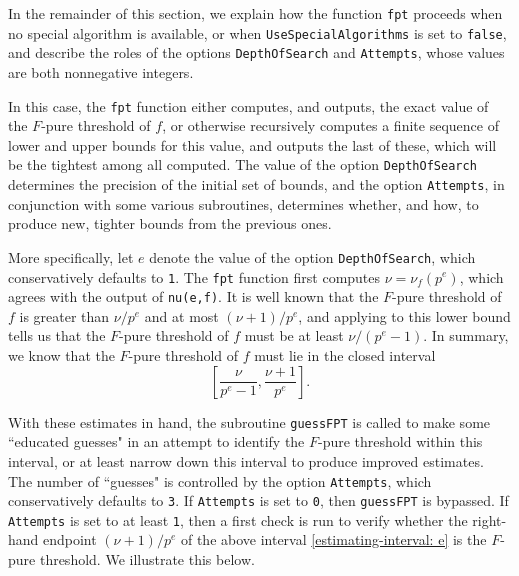 \documentclass{amsart}
\begin{document}
In the remainder of this section, we explain how the function  \texttt{fpt} proceeds when no special algorithm is available, or when \texttt{UseSpecialAlgorithms} is set to \texttt{false}, and describe the roles of the options \texttt{DepthOfSearch} and \texttt{Attempts}, whose values are both nonnegative integers.

In this case, the \texttt{fpt} function either computes, and outputs, the exact value of the $F$-pure threshold of $f$, or otherwise recursively computes a finite sequence of lower and upper bounds for this value, and outputs the last of these, which will be the tightest among all computed.  The value of the option \texttt{DepthOfSearch} determines the precision of the initial set of bounds, and the option \texttt{Attempts}, in conjunction with some various subroutines, determines whether, and how, to produce new, tighter bounds from the previous ones.


More specifically, let $e$ denote the value of the option \texttt{DepthOfSearch}, which conservatively defaults to \texttt{1}.  The \texttt{fpt} function first computes $\nu=\nu_f(p^e)$, which agrees with the output of \texttt{nu(e,f)}.  It is well known that the $F$-pure threshold of $f$ is greater than $\nu/p^e$ and at most $(\nu+1)/p^e$, and applying  \cite[Proposition 4.2]{HernandezFPurityOfHypersurfaces} to this lower bound tells us that the $F$-pure threshold of $f$ must be at least $\nu/(p^e-1)$.  In summary, we know that the $F$-pure threshold of $f$ must lie in the closed interval
%
\begin{equation}
\label{estimating-interval: e}
\tag{$\dagger$}
\left[ \frac{\nu}{p^e-1}, \frac{\nu+1}{p^e} \right].
\end{equation}

With these estimates in hand, the subroutine \texttt{guessFPT} is called to make some ``educated guesses" in an attempt to identify the $F$-pure threshold within this interval, or at least narrow down this interval to produce improved estimates.  The number of ``guesses" is controlled by the option \texttt{Attempts}, which conservatively defaults to \texttt{3}.  If \texttt{Attempts} is set to \texttt{0}, then \texttt{guessFPT} is bypassed. If  \texttt{Attempts} is set to at least \texttt{1}, then a first check is run to verify whether the right-hand endpoint $(\nu+1)/p^e$ of the above interval \eqref{estimating-interval: e} is the $F$-pure threshold.  We illustrate this below.
\end{document}
